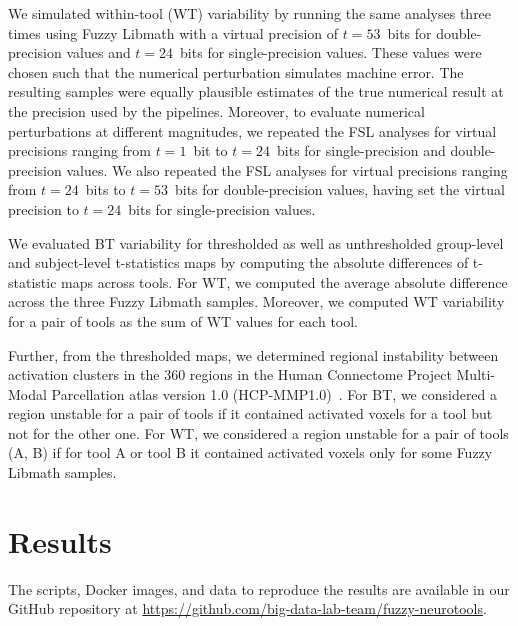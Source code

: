 \documentclass[11pt,onecolumn]{article}
\begin{document}
We simulated within-tool (WT) variability by running the same analyses three
times using Fuzzy Libmath with a virtual precision of $t=53$~bits for
double-precision values and $t=24$~bits for single-precision values. These
values were chosen such that the numerical perturbation simulates machine
error. The resulting samples were equally plausible estimates of
the true
numerical result at the precision used by the pipelines. Moreover, to evaluate numerical perturbations at different magnitudes,
we repeated the FSL analyses for virtual
precisions ranging from $t=1$~bit to $t=24$~bits for single-precision
and double-precision values. We also repeated the FSL analyses for virtual
precisions ranging from $t=24$~bits to $t=53$~bits for double-precision values, having
set the virtual precision to $t=24$~bits for single-precision values.

We evaluated BT variability for thresholded as well as unthresholded
group-level and subject-level t-statistics maps by computing the absolute
differences of t-statistic maps across tools. For WT, we computed the
average absolute difference across the three Fuzzy Libmath samples.
Moreover, we computed WT variability for a pair of tools as the sum of WT values for each tool.

Further, from the thresholded maps, we determined regional instability
between activation clusters in the 360 regions in the Human Connectome
Project Multi-Modal Parcellation atlas version 1.0
(HCP-MMP1.0)~\cite{glasser2016multi}. For BT, we considered a region
unstable for a pair of tools if it contained activated voxels for a tool
but not for the other one. For WT, we considered a region unstable for a
pair of tools (A, B) if for tool A or tool B it contained activated voxels only for some Fuzzy Libmath
samples.

\section{Results}
The scripts, Docker images, and data to reproduce the results are available
in our GitHub repository at
\url{https://github.com/big-data-lab-team/fuzzy-neurotools}.
\end{document}
